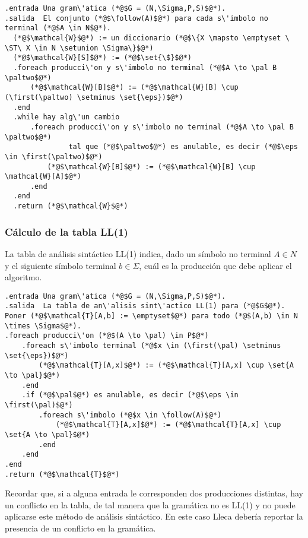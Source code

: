 \documentclass{article}
\newcommand{\lleca}{\textsf{Lleca}\xspace}
\newcommand{\first}{\texttt{FIRST}\xspace}
\newcommand{\follow}{\texttt{FOLLOW}\xspace}
\newcommand{\setunion}{\cup}
\newcommand{\ST}{\mid}
\newcommand{\set}[1]{\{#1\}}
\newcommand{\eps}{\epsilon}
\newcommand{\pal}{\alpha}
\newcommand{\paltwo}{\beta}
\renewcommand{\emptyset}{\varnothing}
\begin{document}
\begin{lstlisting}
.entrada Una gram\'atica (*@$G = (N,\Sigma,P,S)$@*).
.salida  El conjunto (*@$\follow(A)$@*) para cada s\'imbolo no terminal (*@$A \in N$@*).
  (*@$\mathcal{W}$@*) := un diccionario (*@$\{X \mapsto \emptyset \ \ST\ X \in N \setunion \Sigma\}$@*)
  (*@$\mathcal{W}[S]$@*) := (*@$\set{\$}$@*)
  .foreach producci\'on y s\'imbolo no terminal (*@$A \to \pal B \paltwo$@*)
      (*@$\mathcal{W}[B]$@*) := (*@$\mathcal{W}[B] \cup (\first(\paltwo) \setminus \set{\eps})$@*) 
  .end
  .while hay alg\'un cambio
      .foreach producci\'on y s\'imbolo no terminal (*@$A \to \pal B \paltwo$@*)
               tal que (*@$\paltwo$@*) es anulable, es decir (*@$\eps \in \first(\paltwo)$@*)
          (*@$\mathcal{W}[B]$@*) := (*@$\mathcal{W}[B] \cup \mathcal{W}[A]$@*) 
      .end
  .end
  .return (*@$\mathcal{W}$@*)
\end{lstlisting}

\subsubsection{C\'alculo de la tabla LL(1)}

La tabla de an\'alisis sint\'actico LL(1) indica, dado un s\'imbolo no terminal $A \in N$
y el siguiente s\'imbolo terminal $b \in \Sigma$, cu\'al es la producci\'on que debe
aplicar el algoritmo.

\begin{lstlisting}
.entrada Una gram\'atica (*@$G = (N,\Sigma,P,S)$@*).
.salida  La tabla de an\'alisis sint\'actico LL(1) para (*@$G$@*).
Poner (*@$\mathcal{T}[A,b] := \emptyset$@*) para todo (*@$(A,b) \in N \times \Sigma$@*).
.foreach producci\'on (*@$(A \to \pal) \in P$@*)
    .foreach s\'imbolo terminal (*@$x \in (\first(\pal) \setminus \set{\eps})$@*)
        (*@$\mathcal{T}[A,x]$@*) := (*@$\mathcal{T}[A,x] \cup \set{A \to \pal}$@*)
    .end
    .if (*@$\pal$@*) es anulable, es decir (*@$\eps \in \first(\pal)$@*)
        .foreach s\'imbolo (*@$x \in \follow(A)$@*)
            (*@$\mathcal{T}[A,x]$@*) := (*@$\mathcal{T}[A,x] \cup \set{A \to \pal}$@*)
        .end
    .end
.end
.return (*@$\mathcal{T}$@*)
\end{lstlisting}

Recordar que, si a alguna entrada le corresponden dos producciones distintas,
hay un conflicto en la tabla, de tal manera que la gram\'atica no es LL(1)
y no puede aplicarse este m\'etodo de an\'alisis sint\'actico.
En este caso \lleca deber\'ia reportar la presencia de un conflicto en la gram\'atica.
\end{document}

